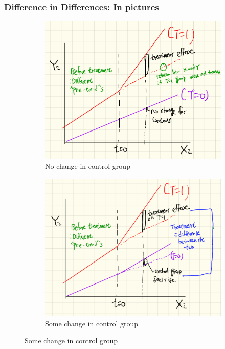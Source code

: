\documentclass[aspectratio=169]{beamer}
\begin{document}
\begin{frame}
\frametitle{Difference in Differences: In pictures}
\begin{figure}[H]
\centering 
\caption{DD estimator}
\begin{subfigure}[b]{.45\textwidth}
\includegraphics[width=\textwidth]{fig1_1.png}
\caption{No change in control group}
\end{subfigure}
\begin{subfigure}[b]{.45\textwidth}
\includegraphics[width=\textwidth]{fig1_2.png}
\caption{Some change in control group}
\end{subfigure}
\end{figure}
\end{frame}
\end{document}
